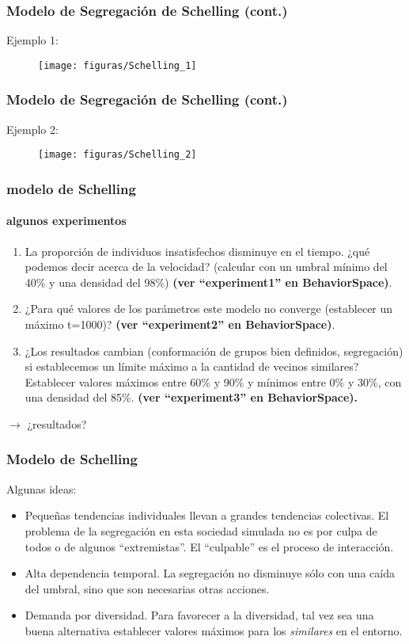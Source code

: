 \documentclass[11pt]{beamer}
\begin{document}
\begin{frame}
\frametitle{Modelo de Segregación de Schelling (cont.)}
Ejemplo 1:
\begin{figure}
	\centering
	\texttt{[image: figuras/Schelling\_1]}
	\label{fig:schelling1}
\end{figure}
\end{frame}

\begin{frame}
\frametitle{Modelo de Segregación de Schelling (cont.)}
Ejemplo 2:
\begin{figure}
	\centering
	\texttt{[image: figuras/Schelling\_2]}
	\label{fig:schelling2}
\end{figure}
\end{frame}

\begin{frame}
	\frametitle{modelo de Schelling}
	\framesubtitle{algunos experimentos}
\begin{enumerate}
\small	\item La proporción de individuos insatisfechos disminuye en el tiempo. ¿qué podemos decir acerca de la velocidad? (calcular con un umbral mínimo del 40\% y una densidad del 98\%) \textbf{(ver ``experiment1'' en BehaviorSpace)}.
	\item ¿Para qué valores de los parámetros este modelo no converge (establecer un máximo t=1000)? \textbf{(ver ``experiment2'' en BehaviorSpace)}.	
	\item ¿Los resultados cambian (conformación de grupos bien definidos, segregación) si establecemos un límite máximo a la cantidad de vecinos similares? Establecer valores máximos entre 60\% y 90\% y mínimos entre 0\% y 30\%, con una densidad del 85\%. \textbf{(ver ``experiment3'' en BehaviorSpace).}
\end{enumerate}	
\vspace{0.6cm}
$\longrightarrow$ \large ¿resultados?
\end{frame}

\begin{frame}
	\frametitle{Modelo de Schelling}
Algunas ideas:
\begin{itemize}
	\item Pequeñas tendencias individuales llevan a grandes tendencias colectivas. El problema de la segregación en esta sociedad simulada no es por culpa de todos o de algunos ``extremistas''. El ``culpable'' es el proceso de interacción.
	\item Alta dependencia temporal. La segregación no disminuye sólo con una caída del umbral, sino que son necesarias otras acciones.
	\item Demanda por diversidad. Para favorecer a la diversidad, tal vez sea una buena alternativa establecer valores máximos para los \textit{similares} en el entorno.
\end{itemize}

\end{frame}
\end{document}
